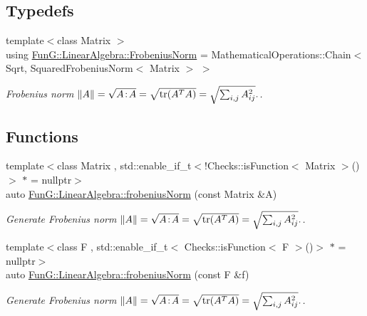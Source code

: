 \subsection*{Typedefs}
\begin{DoxyCompactItemize}
\item 
{\footnotesize template$<$class Matrix $>$ }\\using \hyperlink{group__LinearAlgebraGroup_gad209833e37a25e863fe72868d37795b8}{Fun\+G\+::\+Linear\+Algebra\+::\+Frobenius\+Norm} = Mathematical\+Operations\+::\+Chain$<$ Sqrt, Squared\+Frobenius\+Norm$<$ Matrix $>$ $>$
\begin{DoxyCompactList}\small\item\em Frobenius norm $ \|A\| = \sqrt{A\negthinspace : \negthinspace A }= \sqrt{\mathrm{tr}(A^TA)} = \sqrt{\sum_{i,j} A_{ij}^2}. $. \end{DoxyCompactList}\end{DoxyCompactItemize}
\subsection*{Functions}
\begin{DoxyCompactItemize}
\item 
{\footnotesize template$<$class Matrix , std\+::enable\+\_\+if\+\_\+t$<$!\+Checks\+::is\+Function$<$ Matrix $>$()$>$ $\ast$  = nullptr$>$ }\\auto \hyperlink{group__LinearAlgebraGroup_gaa893e7d667dde98d2b119ca004745186}{Fun\+G\+::\+Linear\+Algebra\+::frobenius\+Norm} (const Matrix \&A)
\begin{DoxyCompactList}\small\item\em Generate Frobenius norm $ \|A\| = \sqrt{A\negthinspace : \negthinspace A }= \sqrt{\mathrm{tr}(A^TA)} = \sqrt{\sum_{i,j} A_{ij}^2}. $. \end{DoxyCompactList}\item 
{\footnotesize template$<$class F , std\+::enable\+\_\+if\+\_\+t$<$ Checks\+::is\+Function$<$ F $>$()$>$ $\ast$  = nullptr$>$ }\\auto \hyperlink{group__LinearAlgebraGroup_gafa2f358f9310cecb787620ad8ec460a6}{Fun\+G\+::\+Linear\+Algebra\+::frobenius\+Norm} (const F \&f)
\begin{DoxyCompactList}\small\item\em Generate Frobenius norm $ \|A\| = \sqrt{A\negthinspace : \negthinspace A }= \sqrt{\mathrm{tr}(A^TA)} = \sqrt{\sum_{i,j} A_{ij}^2}. $. \end{DoxyCompactList}\end{DoxyCompactItemize}
